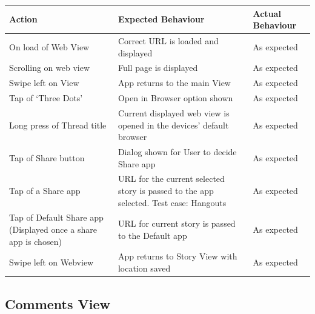 \documentclass[11pt]{article}
\begin{document}
\begin{center}
\begin{tabular}{ | p{5cm} | p{5cm} | p{5cm} |}
	\hline
	\textbf{Action} & \textbf{Expected Behaviour} & \textbf{Actual Behaviour} \\
    \hline
	On load of Web View & Correct URL is loaded and displayed & As expected \\
	\hline
	Scrolling on web view & Full page is displayed & As expected \\
	\hline
	Swipe left on View & App returns to the main View & As expected \\
	\hline
	Tap of ‘Three Dots' & Open in Browser option shown & As expected \\
	\hline
	Long press of Thread title & Current displayed web view is opened in the devices' default browser & As expected \\
	\hline
	Tap of Share button & Dialog shown for User to decide Share app & As expected \\
	\hline
Tap of a Share app & URL for the current selected story is passed to the app selected. Test case: Hangouts & As expected \\
	\hline
Tap of Default Share app (Displayed once a share app is chosen) & URL for current story is passed to the Default app & As expected \\
	\hline
Swipe left on Webview & App returns to Story View with location saved & As expected \\
	\hline

\end{tabular}
\end{center}

\subsection*{Comments View}
\end{document}
